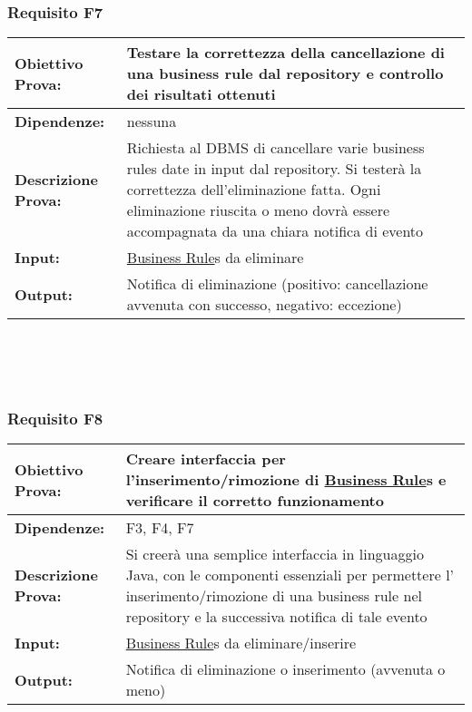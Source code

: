 \subsubsection{Requisito F7}
\begin{tabular}{||p{4cm}||p{8cm}||}
\hline
{\textbf {Obiettivo Prova:}}& Testare la correttezza della cancellazione di una business rule dal repository e controllo dei risultati ottenuti\\ \hline
{\textbf{Dipendenze:}}& nessuna \\ \hline
{\textbf{Descrizione Prova:}}&  Richiesta al DBMS di cancellare varie business rules date in input dal repository. Si tester\`a la correttezza dell'eliminazione fatta. Ogni eliminazione riuscita o meno dovr\`a essere accompagnata da una chiara notifica di evento\\ \hline
{\textbf{Input:}}& \underline{Business Rule}s da eliminare \\ \hline
{\textbf{Output:}}& Notifica di eliminazione (positivo: cancellazione avvenuta con successo, negativo: eccezione) \\ \hline
\end{tabular} \\
\\
\\
\subsubsection{Requisito F8}
\begin{tabular}{||p{4cm}||p{8cm}||}
\hline
{\textbf {Obiettivo Prova:}}& Creare interfaccia per l'inserimento/rimozione di \underline{Business Rule}s e verificare il corretto funzionamento\\ \hline
{\textbf{Dipendenze:}}& F3, F4, F7 \\ \hline
{\textbf{Descrizione Prova:}}& Si creer\`a  una semplice interfaccia in linguaggio Java, con le componenti essenziali per permettere l' inserimento/rimozione di una business rule nel repository e la successiva notifica di tale evento \\ \hline
{\textbf{Input:}}& \underline{Business Rule}s da eliminare/inserire \\ \hline
{\textbf{Output:}}& Notifica di eliminazione o inserimento (avvenuta o meno) \\ \hline
\end{tabular} \\
\\
\\
